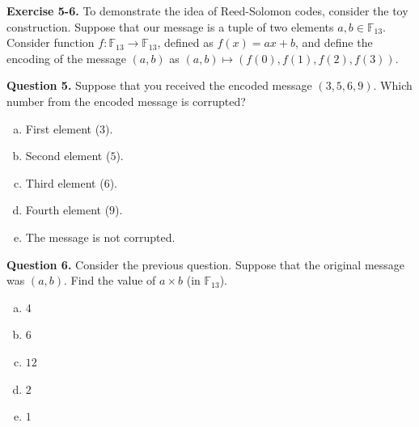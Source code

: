 \documentclass[../lecture-notes.tex]{subfiles}
\begin{document}
\textbf{Exercise 5-6.} To demonstrate the idea of Reed-Solomon codes, consider the toy construction. Suppose that our message is a tuple of two elements $a,b \in \mathbb{F}_{13}$. Consider function $f: \mathbb{F}_{13} \to \mathbb{F}_{13}$, defined as $f(x) = ax+b$, and define the encoding of the message $(a,b)$ as $(a,b) \mapsto (f(0),f(1),f(2),f(3))$. 

\textbf{Question 5.} Suppose that you received the encoded message $(3,5,6,9)$. Which number from the encoded message is corrupted?
\begin{multicols}{2}
    \begin{enumerate}[a)]
        \item First element ($3$).
        \item Second element ($5$).
        \item Third element ($6$).
        \item Fourth element ($9$).
        \item The message is not corrupted.
    \end{enumerate}
\end{multicols}

\textbf{Question 6.} Consider the previous question. Suppose that the original message was $(a,b)$. Find the value of $a \times b$ (in $\mathbb{F}_{13}$).
\begin{multicols}{3}
    \begin{enumerate}[a)]
        \item $4$
        \item $6$
        \item $12$
        \item $2$
        \item $1$
    \end{enumerate}
\end{multicols}
\end{document}
